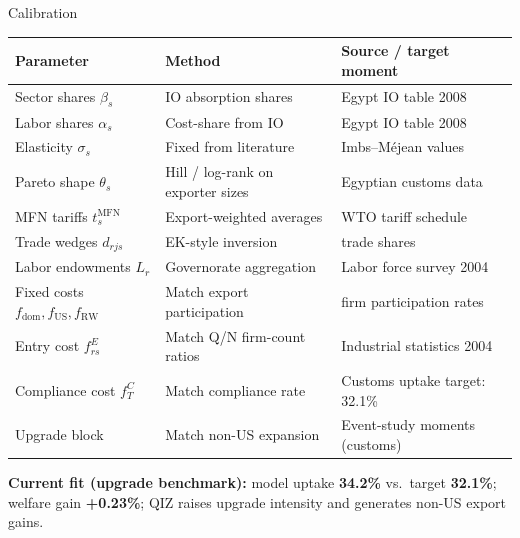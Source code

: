 \documentclass[aspectratio=169,10pt]{beamer}
\begin{document}
\begin{frame}{Calibration}
\scriptsize
\begin{tabular}{>{\raggedright\arraybackslash}p{2.5cm}
                >{\raggedright\arraybackslash}p{4.0cm}
                >{\raggedright\arraybackslash}p{5.0cm}}
\toprule
\textbf{Parameter} & \textbf{Method} & \textbf{Source / target moment} \\
\midrule
Sector shares $\beta_s$ & IO absorption shares & Egypt IO table 2008 \\
Labor shares $\alpha_s$ & Cost-share from IO & Egypt IO table 2008 \\
Elasticity $\sigma_s$ & Fixed from literature & Imbs--M\'ejean values \\
Pareto shape $\theta_s$ & Hill / log-rank on exporter sizes & Egyptian customs data \\
MFN tariffs $t_s^{\text{MFN}}$ & Export-weighted averages & WTO tariff schedule \\
Trade wedges $d_{rjs}$ & EK-style inversion & 2004 trade shares \\
Labor endowments $L_r$ & Governorate aggregation & Labor force survey 2004 \\
Fixed costs $f_{\text{dom}},f_{\text{US}},f_{\text{RW}}$ & Match export participation & 2004 firm participation rates \\
Entry cost $f^E_{rs}$ & Match Q/N firm-count ratios & Industrial statistics 2004 \\
Compliance cost $f^C_T$ & Match compliance rate & Customs uptake target: 32.1\% \\
Upgrade block & Match non-US expansion & Event-study moments (customs) \\
\bottomrule
\end{tabular}

\vspace{0.5em}
\normalsize\textbf{Current fit (upgrade benchmark):} model uptake \textbf{34.2\%} vs.\ target \textbf{32.1\%}; welfare gain \textbf{+0.23\%}; QIZ raises upgrade intensity and generates non-US export gains.
\end{frame}
\end{document}
